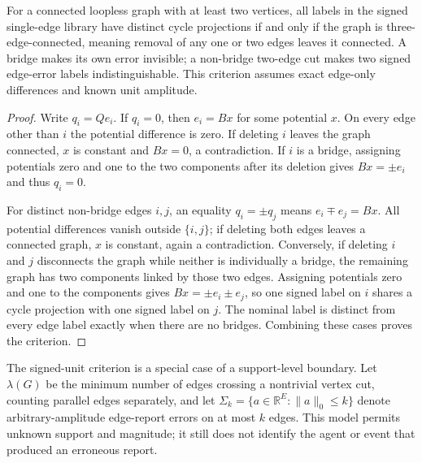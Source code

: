 \documentclass[11pt,a4paper]{article}
\begin{document}
\begin{theorem}\label{thm:three-edge-identifiability}
For a connected loopless graph with at least two vertices, all labels in the signed single-edge library have distinct cycle projections if and only if the graph is three-edge-connected, meaning removal of any one or two edges leaves it connected. A bridge makes its own error invisible; a non-bridge two-edge cut makes two signed edge-error labels indistinguishable. This criterion assumes exact edge-only differences and known unit amplitude.
\end{theorem}
\begin{proof}
Write $q_i=Qe_i$. If $q_i=0$, then $e_i=Bx$ for some potential $x$. On every edge other than $i$ the potential difference is zero. If deleting $i$ leaves the graph connected, $x$ is constant and $Bx=0$, a contradiction. If $i$ is a bridge, assigning potentials zero and one to the two components after its deletion gives $Bx=\pm e_i$ and thus $q_i=0$.

For distinct non-bridge edges $i,j$, an equality $q_i=\pm q_j$ means $e_i\mp e_j=Bx$. All potential differences vanish outside $\{i,j\}$; if deleting both edges leaves a connected graph, $x$ is constant, again a contradiction. Conversely, if deleting $i$ and $j$ disconnects the graph while neither is individually a bridge, the remaining graph has two components linked by those two edges. Assigning potentials zero and one to the components gives $Bx=\pm e_i\pm e_j$, so one signed label on $i$ shares a cycle projection with one signed label on $j$. The nominal label is distinct from every edge label exactly when there are no bridges. Combining these cases proves the criterion.
\end{proof}

The signed-unit criterion is a special case of a support-level boundary. Let $\lambda(G)$ be the minimum number of edges crossing a nontrivial vertex cut, counting parallel edges separately, and let $\Sigma_k=\{a\in\mathbb R^E:\|a\|_0\le k\}$ denote arbitrary-amplitude edge-report errors on at most $k$ edges. This model permits unknown support and magnitude; it still does not identify the agent or event that produced an erroneous report.
\end{document}
